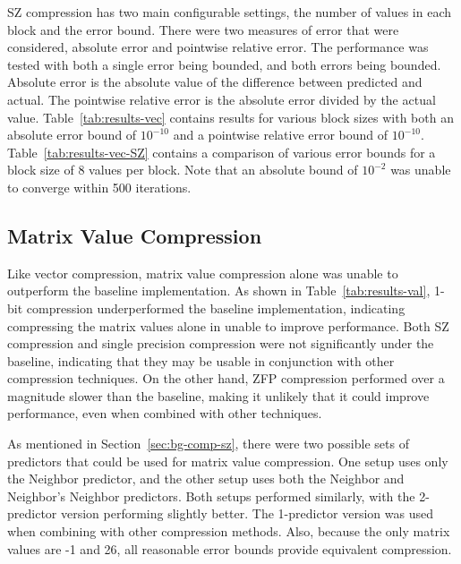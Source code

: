

SZ compression has two main configurable settings, the number of values in each block and the error bound.
There were two measures of error that were considered, absolute error and pointwise relative error.
The performance was tested with both a single error being bounded, and both errors being bounded.
Absolute error is the absolute value of the difference between predicted and actual.
The pointwise relative error is the absolute error divided by the actual value.
Table~\ref{tab:results-vec} contains results for various block sizes with both an absolute error bound of \(10^{-10}\) and a pointwise relative error bound of \(10^{-10}\).
Table~\ref{tab:results-vec-SZ} contains a comparison of various error bounds for a block size of 8 values per block.
Note that an absolute bound of \(10^{-2}\) was unable to converge within 500 iterations.




\subsection{Matrix Value Compression}
\label{sec:results-vals}
Like vector compression, matrix value compression alone was unable to outperform the baseline implementation.
As shown in Table~\ref{tab:results-val}, 1-bit compression underperformed the baseline implementation, indicating compressing the matrix values alone in unable to improve performance.
Both SZ compression and single precision compression were not significantly under the baseline, indicating that they may be usable in conjunction with other compression techniques.
On the other hand, ZFP compression performed over a magnitude slower than the baseline, making it unlikely that it could improve performance, even when combined with other techniques.

As mentioned in Section~\ref{sec:bg-comp-sz}, there were two possible sets of predictors that could be used for matrix value compression.
One setup uses only the Neighbor predictor, and the other setup uses both the Neighbor and Neighbor's Neighbor predictors.
Both setups performed similarly, with the 2-predictor version performing slightly better.
The 1-predictor version was used when combining with other compression methods.
Also, because the only matrix values are -1 and 26, all reasonable error bounds provide equivalent compression.

